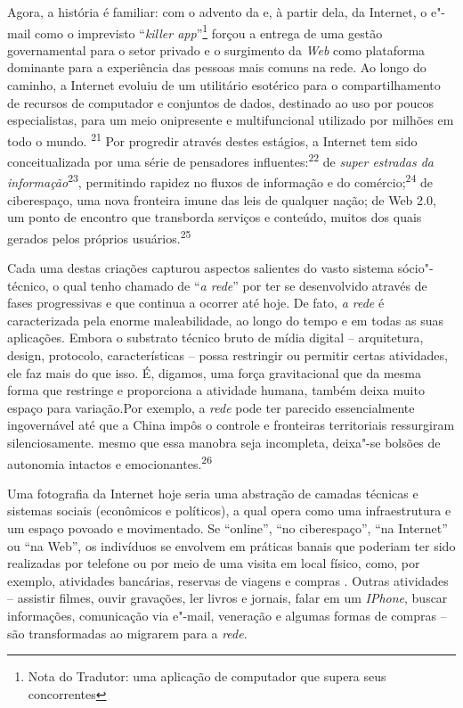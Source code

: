 Agora, a história é familiar: com o advento da \emph{} e, à
partir dela, da Internet, o e"-mail como o imprevisto ``\emph{killer
app}''\footnote{Nota do Tradutor: uma aplicação de computador que supera
  seus concorrentes} forçou a entrega de uma gestão governamental para o
setor privado e o surgimento da \emph{Web} como plataforma dominante
para a experiência das pessoas mais comuns na rede. Ao longo do caminho,
a Internet evoluiu de um utilitário esotérico para o compartilhamento de
recursos de computador e conjuntos de dados, destinado ao uso por poucos
especialistas, para um meio onipresente e multifuncional utilizado por
milhões em todo o mundo. \textsuperscript{{21}} Por progredir através
destes estágios, a Internet tem sido conceitualizada por uma série de
pensadores influentes:\textsuperscript{{22}} de \emph{super estradas da
informação}\textsuperscript{{23}}, permitindo rapidez no fluxos de
informação e do comércio;\textsuperscript{{24}} de ciberespaço, uma nova
fronteira imune das leis de qualquer nação; de Web 2.0, um ponto de
encontro que transborda serviços e conteúdo, muitos dos quais gerados
pelos próprios usuários.\textsuperscript{{25}}

Cada uma destas criações capturou aspectos salientes do vasto sistema
sócio"-técnico, o qual tenho chamado de ``\emph{a rede}'' por ter se
desenvolvido através de fases progressivas e que continua a ocorrer até
hoje. De fato, \emph{a rede} é caracterizada pela enorme maleabilidade,
ao longo do tempo e em todas as suas aplicações. Embora o substrato
técnico bruto de mídia digital -- arquitetura, design, protocolo,
características -- possa restringir ou permitir certas atividades, ele
faz mais do que isso. É, digamos, uma força gravitacional que da mesma
forma que restringe e proporciona a atividade humana, também deixa muito
espaço para variação.Por exemplo, a \emph{rede} pode ter parecido
essencialmente ingovernável até que a China impôs o controle e
fronteiras territoriais ressurgiram silenciosamente. mesmo que essa
manobra seja incompleta, deixa"-se bolsões de autonomia intactos e
emocionantes.\textsuperscript{{26}}

Uma fotografia da Internet hoje seria uma abstração de camadas técnicas
e sistemas sociais (econômicos e políticos), a qual opera como uma
infraestrutura e um espaço povoado e movimentado. Se ``online'', ``no
ciberespaço'', ``na Internet'' ou ``na Web'', os indivíduos se envolvem em
práticas banais que poderiam ter sido realizadas por telefone ou por
meio de uma visita em local físico, como, por exemplo, atividades
bancárias, reservas de viagens e compras . Outras atividades -- assistir
filmes, ouvir gravações, ler livros e jornais, falar em um
\emph{IPhone}, buscar informações, comunicação via e"-mail, veneração e
algumas formas de compras -- são transformadas ao migrarem para a
\emph{rede}.


